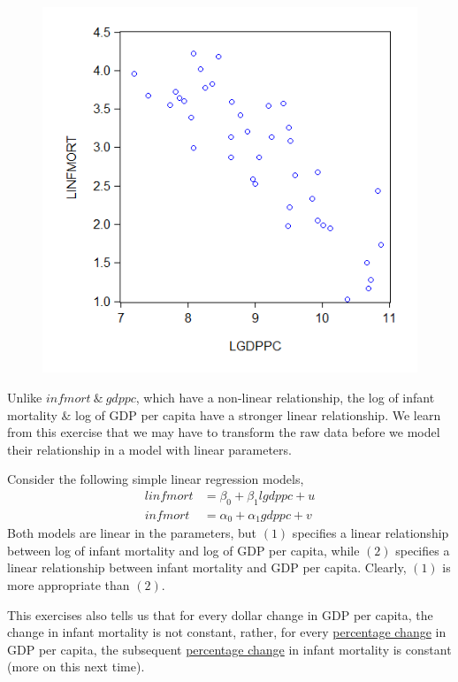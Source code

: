 \documentclass[12pt]{report}
\begin{document}
\vspace{-\baselineskip}	
\begin{figure}[H]
	\centerline{\includegraphics{scatter}}
\end{figure}
\vspace{-\baselineskip}	\noindent Unlike $infmort\ \&\ gdppc$, which have a non-linear relationship, the log of infant mortality $\&$ log of GDP per capita have a stronger linear relationship. We learn from this exercise that we may have to transform the raw data before we model their relationship in a model with linear parameters.

\noindent Consider the following simple linear regression models,
\begin{align}
linfmort &= \beta_0 + \beta_1 lgdppc + u \\
infmort &= \alpha_0 + \alpha_1 gdppc + v
\end{align}
\noindent Both models are linear in the parameters, but $(1)$ specifies a linear relationship between log of infant mortality and log of GDP per capita, while $(2)$ specifies a linear relationship between infant mortality and GDP per capita. Clearly, $(1)$ is more appropriate than $(2)$.

\noindent This exercises also tells us that for every dollar change in GDP per capita, the change in infant mortality is not constant, rather, for every \uline{percentage change} in GDP per capita, the subsequent \uline{percentage change} in infant mortality is constant (more on this next time).
\end{document}
